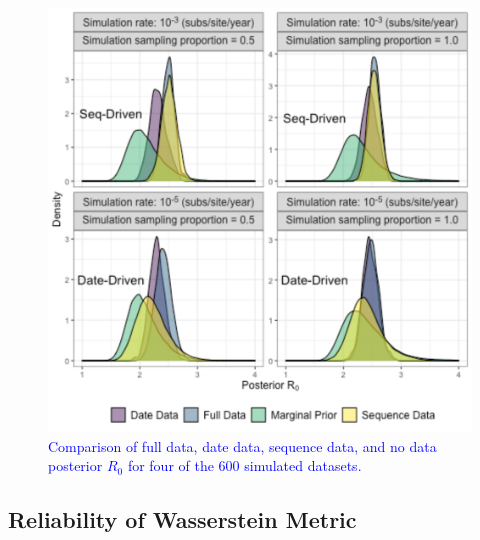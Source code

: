 \documentclass{article}
\begin{document}
\begin{figure}[H]
\centering
\includegraphics[width=1\linewidth]{../figures/postEg.pdf}
\caption{\textcolor{blue}{Comparison of full data, date data, sequence data, and no data posterior $R_0$ for four of the 600 simulated datasets. }}
\label{fig:posts}
\end{figure}
\subsection*{Reliability of Wasserstein Metric}
\end{document}
